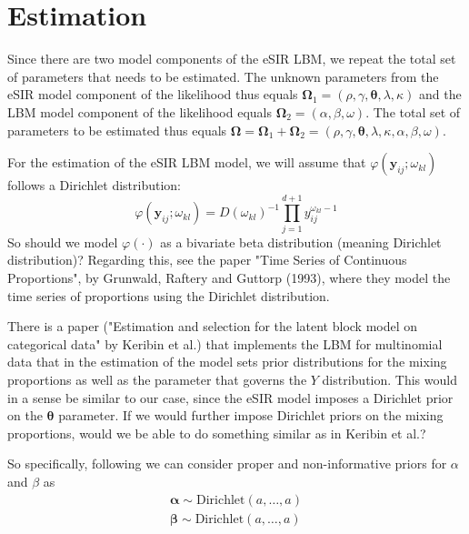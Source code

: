 \documentclass[10pt,a4paper]{article}
\begin{document}
\section{Estimation}

Since there are two model components of the eSIR LBM, we repeat the total set of parameters that needs to be estimated. The unknown parameters from the eSIR model component of the likelihood thus equals 
%
$ 
\boldsymbol{\Omega}_1 = (\rho, \gamma, \boldsymbol{\theta}, \lambda, \kappa)
$ 
%
and the LBM model component of the likelihood equals
%
$ 
\boldsymbol{\Omega}_2 = (\alpha, \beta, \omega).
$ 
%
The total set of parameters to be estimated thus equals 
%
$
\boldsymbol{\Omega} = \boldsymbol{\Omega}_1 + \boldsymbol{\Omega}_2 = (\rho, \gamma, \boldsymbol{\theta}, \lambda, \kappa, \alpha, \beta, \omega).
$
%

For the estimation of the eSIR LBM model, we will assume that $\varphi(\mathbf{y}_{ij}; \omega_{kl})$ follows a Dirichlet distribution:
%
$$
\varphi(\mathbf{y}_{ij}; \omega_{kl}) = D(\omega_{kl})^{-1} \prod_{j=1}^{d+1} y_{ij}^{\omega_{kl}-1}
$$
%
So should we model $\varphi(\cdot)$ as a bivariate beta distribution (meaning Dirichlet distribution)? Regarding this, see the paper "Time Series of Continuous Proportions", by Grunwald, Raftery and Guttorp (1993), where they model the time series of proportions using the Dirichlet distribution.


There is a paper ("Estimation and selection for the latent block model on categorical data" by Keribin et al.) that implements the LBM for multinomial data that in the estimation of the model sets prior distributions for the mixing proportions as well as the parameter that governs the $Y$ distribution. This would in a sense be similar to our case, since the eSIR model imposes a Dirichlet prior on the $\boldsymbol{\theta}$ parameter. If we would further impose Dirichlet priors on the mixing proportions, would we be able to do something similar as in Keribin et al.?

So specifically, following \parencite{keribin2015estimation} we can consider proper and non-informative priors for $\alpha$ and $\beta$ as
%
\begin{equation}
	\begin{aligned}
		\boldsymbol{\alpha} \sim \text{Dirichlet}(a, \ldots, a) \\
		\boldsymbol{\beta} \sim \text{Dirichlet}(a, \ldots, a)
	\end{aligned}
\end{equation}
%
\end{document}
